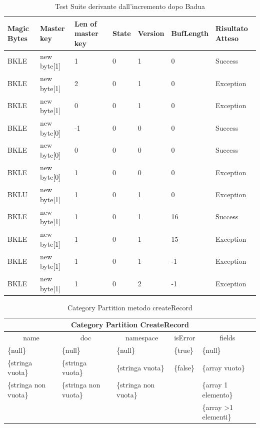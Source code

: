 \documentclass[10pt, a4paper]{article}
\begin{document}
\begin{table}[ht]
  \centering
  \caption[FileInfo: Test Suite - Adequacy Data Flow]{Test Suite derivante dall'incremento dopo Badua}
  \begin{tabular}{|l|l|l|l|l|l|l|}
    \hline
    \textbf{Magic Bytes} & \textbf{Master key} & \textbf{Len of master key}  & \textbf{State} & \textbf{Version} & \textbf{BufLength} & \textbf{Risultato Atteso} \\
    \hline
    BKLE & new byte[1] & 1 & 0 & 1 & 0 & Success \\
    BKLE & new byte[1] & 2 & 0 & 1 & 0 & Exception \\
    BKLE & new byte[1] & 0 & 0 & 1 & 0 & Exception \\
    BKLE & new byte[0] & -1 & 0 & 0 & 0 & Success \\
    BKLE & new byte[0] & 0 & 0 & 0 & 0 & Success \\
    BKLE & new byte[0] & 1 & 0 & 0 & 0 & Exception \\
    BKLU & new byte[1] & 1 & 0 & 1 & 0 & Exception \\
    BKLE & new byte[1] & 1 & 0 & 1 & 16 & Success \\
    BKLE & new byte[1] & 1 & 0 & 1 & 15 & Exception \\
    BKLE & new byte[1] & 1 & 0 & 1 & -1 & Exception \\
    BKLE & new byte[1] & 1 & 0 & 2 & -1 & Exception \\
    \hline
  \end{tabular}
  \label{tab:ADF1ReadHeader}
\end{table}



\begin{table}[ht]
  \centering
  \caption[Schema - Category Partition]{Category Partition metodo createRecord}
  \begin{tabular}{|l|l|l|l|l|}
  \hline
  \multicolumn{5}{|c|}{Category Partition CreateRecord}\\
  \hline
  \multicolumn{1}{|c|}{name} & \multicolumn{1}{|c|}{doc} & \multicolumn{1}{|c|}{namespace} & 
  \multicolumn{1}{|c|}{isError} & \multicolumn{1}{|c|}{fields} \\
  \hline
  \{null\} & \{null\} & \{null\} & \{true\} & \{null\} \\
  \{stringa vuota\} & \{stringa vuota\} & \{stringa vuota\} & \{false\} & \{array vuoto\} \\
  \{stringa non vuota\} & \{stringa non vuota\} & \{stringa non vuota\} & & \{array 1 elemento\} \\
  & & & & \{array \textgreater 1 elementi\} \\
  \hline
  \end{tabular}
  \label{tab:categoryPartitionCreateRecord}
\end{table}
\end{document}
